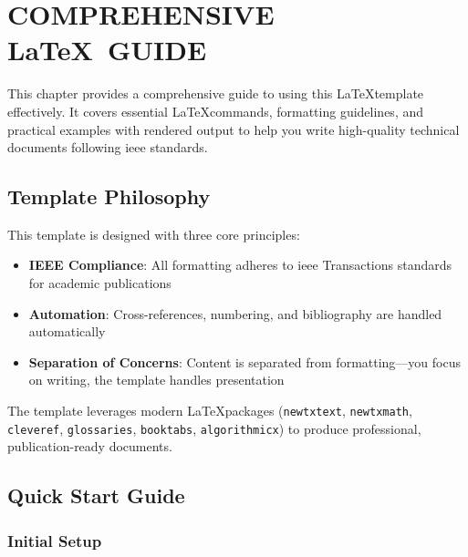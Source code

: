 
\chapter{COMPREHENSIVE \LaTeX~GUIDE}
This chapter provides a comprehensive guide to using this \LaTeX template effectively. It covers essential \LaTeX commands, formatting guidelines, and practical examples with rendered output to help you write high-quality technical documents following \gls{ieee} standards.

\section*{Template Philosophy}

This template is designed with three core principles:

\begin{itemize}
    \item \textbf{IEEE Compliance}: All formatting adheres to \gls{ieee} Transactions standards for academic publications
    \item \textbf{Automation}: Cross-references, numbering, and bibliography are handled automatically
    \item \textbf{Separation of Concerns}: Content is separated from formatting---you focus on writing, the template handles presentation
\end{itemize}

The template leverages modern \LaTeX packages (\texttt{newtxtext}, \texttt{newtxmath}, \texttt{cleveref}, \texttt{glossaries}, \texttt{booktabs}, \texttt{algorithmicx}) to produce professional, publication-ready documents.

\section*{Quick Start Guide}

\subsection*{Initial Setup}

